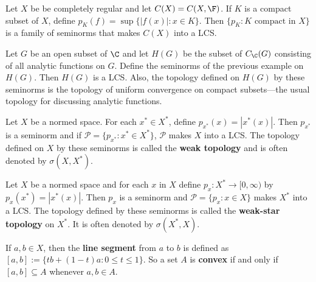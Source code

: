 \begin{eg}
    Let $X$ be be completely regular and let $C(X) = C(X,\F)$. If $K$ is a compact subset of $X$, define $p_K(f) = \sup\{|f(x)|:x \in K\}$. Then $\{p_K:K\text{ compact in }X\}$ is a family of seminorms that makes $C(X)$ into a LCS.
\end{eg}

\begin{eg}
    Let $G$ be an open subset of $\C$ and let $H(G)$ be the subset of $C_{\C}(G)$ consisting of all analytic functions on $G$. Define the seminorms of the previous example on $H(G)$. Then $H(G)$ is a LCS. Also, the topology defined on $H(G)$ by these seminorms is the topology of uniform convergence on compact subsets---the usual topology for discussing analytic functions.
\end{eg}

\begin{eg}
    Let $X$ be a normed space. For each $x^* \in X^*$, define $p_{x^*}(x) = |x^*(x)|$. Then $p_{x^*}$ is a seminorm and if $\mathscr{P} = \{p_{x^*}:x^* \in X^*\}$, $\mathscr{P}$ makes $X$ into a LCS. The topology defined on $X$ by these seminorms is called the \textbf{weak topology} and is often denoted by $\sigma(X,X^*)$.
\end{eg}

\begin{eg}
    Let $X$ be a normed space and for each $x$ in $X$ define $p_x:X^*\rightarrow [0,\infty)$ by $p_x(x^*) = |x^*(x)|$. Then $p_x$ is a seminorm and $\mathscr{P} = \{p_x:x \in X\}$ makes $X^*$ into a LCS. The topology defined by these seminorms is called the \textbf{weak-star topology} on $X^*$. It is often denoted by $\sigma(X^*,X)$.
\end{eg}

If $a,b \in X$, then the \textbf{line segment} from $a$ to $b$ is defined as $[a,b] := \{tb+(1-t)a:0\leq t\leq 1\}$. So a set $A$ is \textbf{convex} if and only if $[a,b] \subseteq A$ whenever $a,b \in A$.


